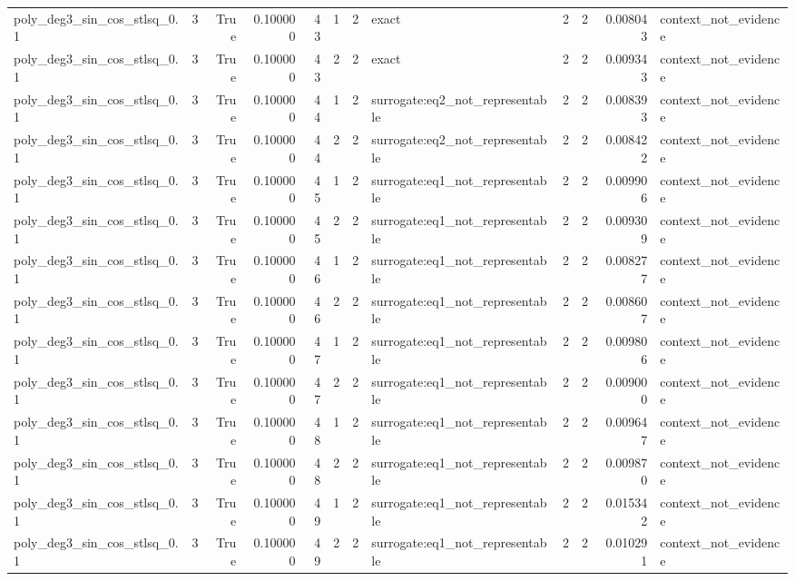 \begin{tabular}{lrrrrrrlrrrl}
poly\_deg3\_sin\_cos\_stlsq\_0.1 & 3 & True & 0.100000 & 43 & 1 & 2 & exact & 2 & 2 & 0.008043 & context\_not\_evidence \\
poly\_deg3\_sin\_cos\_stlsq\_0.1 & 3 & True & 0.100000 & 43 & 2 & 2 & exact & 2 & 2 & 0.009343 & context\_not\_evidence \\
poly\_deg3\_sin\_cos\_stlsq\_0.1 & 3 & True & 0.100000 & 44 & 1 & 2 & surrogate:eq2\_not\_representable & 2 & 2 & 0.008393 & context\_not\_evidence \\
poly\_deg3\_sin\_cos\_stlsq\_0.1 & 3 & True & 0.100000 & 44 & 2 & 2 & surrogate:eq2\_not\_representable & 2 & 2 & 0.008422 & context\_not\_evidence \\
poly\_deg3\_sin\_cos\_stlsq\_0.1 & 3 & True & 0.100000 & 45 & 1 & 2 & surrogate:eq1\_not\_representable & 2 & 2 & 0.009906 & context\_not\_evidence \\
poly\_deg3\_sin\_cos\_stlsq\_0.1 & 3 & True & 0.100000 & 45 & 2 & 2 & surrogate:eq1\_not\_representable & 2 & 2 & 0.009309 & context\_not\_evidence \\
poly\_deg3\_sin\_cos\_stlsq\_0.1 & 3 & True & 0.100000 & 46 & 1 & 2 & surrogate:eq1\_not\_representable & 2 & 2 & 0.008277 & context\_not\_evidence \\
poly\_deg3\_sin\_cos\_stlsq\_0.1 & 3 & True & 0.100000 & 46 & 2 & 2 & surrogate:eq1\_not\_representable & 2 & 2 & 0.008607 & context\_not\_evidence \\
poly\_deg3\_sin\_cos\_stlsq\_0.1 & 3 & True & 0.100000 & 47 & 1 & 2 & surrogate:eq1\_not\_representable & 2 & 2 & 0.009806 & context\_not\_evidence \\
poly\_deg3\_sin\_cos\_stlsq\_0.1 & 3 & True & 0.100000 & 47 & 2 & 2 & surrogate:eq1\_not\_representable & 2 & 2 & 0.009000 & context\_not\_evidence \\
poly\_deg3\_sin\_cos\_stlsq\_0.1 & 3 & True & 0.100000 & 48 & 1 & 2 & surrogate:eq1\_not\_representable & 2 & 2 & 0.009647 & context\_not\_evidence \\
poly\_deg3\_sin\_cos\_stlsq\_0.1 & 3 & True & 0.100000 & 48 & 2 & 2 & surrogate:eq1\_not\_representable & 2 & 2 & 0.009870 & context\_not\_evidence \\
poly\_deg3\_sin\_cos\_stlsq\_0.1 & 3 & True & 0.100000 & 49 & 1 & 2 & surrogate:eq1\_not\_representable & 2 & 2 & 0.015342 & context\_not\_evidence \\
poly\_deg3\_sin\_cos\_stlsq\_0.1 & 3 & True & 0.100000 & 49 & 2 & 2 & surrogate:eq1\_not\_representable & 2 & 2 & 0.010291 & context\_not\_evidence \\

\end{tabular}
